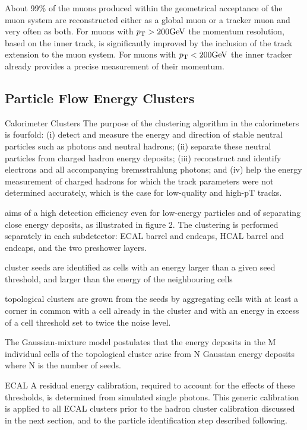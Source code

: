 About 99\% of the muons produced within the geometrical acceptance of the muon system are 
reconstructed either as a global muon or a tracker muon and very often as both.
For muons with $p_\mathrm{T} > 200\mathrm{GeV}$ the momentum resolution, based on the inner track, is significantly 
improved by the inclusion of the track extension to the muon system.
For muons with $p_\mathrm{T} < 200\mathrm{GeV}$ the inner tracker already provides a precise measurement of 
their momentum.



\subsection{Particle Flow Energy Clusters}
Calorimeter Clusters
The purpose of the clustering algorithm in the calorimeters is fourfold: (i) detect and measure the energy and direction of stable neutral particles such as photons and neutral hadrons; (ii) separate these neutral particles from charged hadron energy deposits; (iii) reconstruct and identify electrons and all accompanying bremsstrahlung photons; and (iv) help the energy measurement of charged hadrons for which the track parameters were not determined accurately, which is the case for low-quality and high-pT tracks.

aims of a high detection efficiency even for low-energy particles and of separating close energy deposits, as illustrated in figure 2. The clustering is performed separately in each subdetector: ECAL barrel and endcaps, HCAL barrel and endcaps, and the two preshower layers.

cluster seeds are identified as cells with an energy larger than a given seed threshold, and larger than the energy of the neighbouring cells

topological clusters are grown from the seeds by aggregating cells with at least a corner in common with a cell already in the cluster and with an energy in excess of a cell threshold set to twice the noise level.

The Gaussian-mixture model postulates that the energy deposits in the M individual cells of the 
topological cluster arise from N Gaussian energy deposits where N is the number of seeds.


ECAL
A residual energy calibration, required to account for the effects of these thresholds, is determined from simulated single photons. This generic calibration is applied to all ECAL clusters prior to the hadron cluster calibration discussed in the next section, and to the particle identification step described following.

